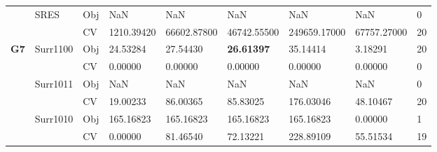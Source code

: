 \begin{table*}[!htb]
\begin{tabular}{lllllllll}
		& SRES                               & Obj                                & NaN                                & NaN                                & NaN                                  & NaN                                 & NaN                               & 0                \\
		&                                    & CV                                 & 1210.39420                         & 66602.87800                        & 46742.55500                          & 249659.17000                        & 67757.27000                       & 20               \\ \hline
		\multirow{16}{*}{\textbf{G7}}                & \multirow{2}{*}{Surr1100}          & Obj                                & 24.53284                           & 27.54430                           & \textbf{26.61397}                    & 35.14414                            & 3.18291                           & 20               \\
		&                                    & CV                                 & 0.00000                            & 0.00000                            & 0.00000                              & 0.00000                             & 0.00000                           & 0                \\
		& \multirow{2}{*}{Surr1011}          & Obj                                & NaN                                & NaN                                & NaN                                  & NaN                                 & NaN                               & 0                \\
		&                                    & CV                                 & 19.00233                           & 86.00365                           & 85.83025                             & 176.03046                           & 48.10467                          & 20               \\
		& \multirow{2}{*}{Surr1010}          & Obj                                & 165.16823                          & 165.16823                          & 165.16823                            & 165.16823                           & 0.00000                           & 1                \\
		&                                    & CV                                 & 0.00000                            & 81.46540                           & 72.13221                             & 228.89109                           & 55.51534                          & 19               \\

\end{tabular}
\end{table*}
